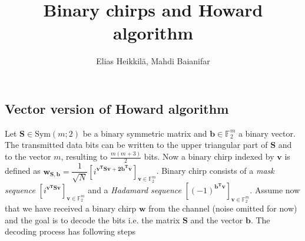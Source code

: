 \documentclass{article}
\title{Binary chirps and Howard algorithm}
\author{Elias Heikkilä, Mahdi Baianifar}
\date{}
\begin{document}
	\maketitle

\subsection*{Vector version of Howard algorithm}
Let $\mathbf{S} \in \text{Sym}(m; 2)$ be a binary symmetric matrix and $\mathbf{b} \in \mathbb{F}_2^m$ a binary vector. The transmitted data bits can be written to the upper triangular part of $\mathbf{S}$ and to the vector $m$, resulting to $\frac{m(m+3)}{2}$ bits. Now a binary chirp indexed by $\mathbf{v}$ is defined as $\mathbf{w}_{\mathbf{S,b}} = \dfrac{1}{\sqrt{N}}\left[i^{\mathbf{v^TSv + 2b^Tv}}\right]_{\mathbf{v} \in \mathbb{F}_2^m}$.
Binary chirp consists of a \textit{mask sequence} $\left[i^{\mathbf{v^TSv}}\right]_{\mathbf{v} \in \mathbb{F}_2^m}$ and a \textit{Hadamard sequence} $\left[(-1)^{\mathbf{b^Tv}}\right]_{\mathbf{v} \in \mathbb{F}_2^m}$. Assume now that we have received a binary chirp $\mathbf{w}$ from the channel (noise omitted for now) and the goal is to decode the bits i.e. the matrix $\mathbf{S}$ and the vector $\mathbf{b}$. The decoding process has following steps
\end{document}
